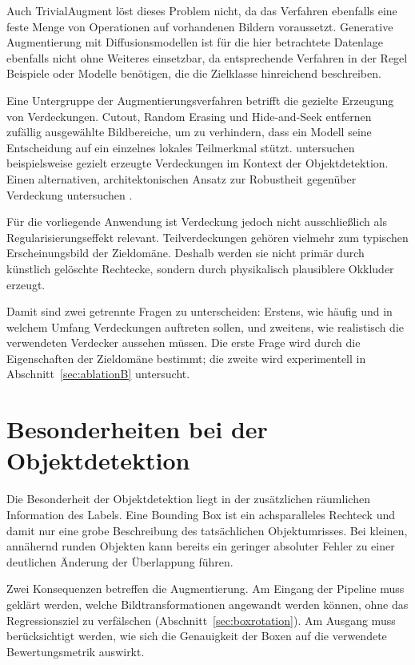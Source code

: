 Auch TrivialAugment \parencite{mueller2021} löst dieses Problem nicht, da das Verfahren ebenfalls eine feste Menge von Operationen auf vorhandenen Bildern voraussetzt. Generative Augmentierung mit Diffusionsmodellen \parencite{trabucco2024} ist für die hier betrachtete Datenlage ebenfalls nicht ohne Weiteres einsetzbar, da entsprechende Verfahren in der Regel Beispiele oder Modelle benötigen, die die Zielklasse hinreichend beschreiben.

Eine Untergruppe der Augmentierungsverfahren betrifft die gezielte Erzeugung von Verdeckungen. Cutout, Random Erasing und Hide-and-Seek entfernen zufällig ausgewählte Bildbereiche, um zu verhindern, dass ein Modell seine Entscheidung auf ein einzelnes lokales Teilmerkmal stützt. \textcite{wang2017afastrcnn} untersuchen beispielsweise gezielt erzeugte Verdeckungen im Kontext der Objektdetektion. Einen alternativen, architektonischen Ansatz zur Robustheit gegenüber Verdeckung untersuchen \textcite{kortylewski2020}.

Für die vorliegende Anwendung ist Verdeckung jedoch nicht ausschließlich als Regularisierungseffekt relevant. Teilverdeckungen gehören vielmehr zum typischen Erscheinungsbild der Zieldomäne. Deshalb werden sie nicht primär durch künstlich gelöschte Rechtecke, sondern durch physikalisch plausiblere Okkluder erzeugt.

Damit sind zwei getrennte Fragen zu unterscheiden: Erstens, wie häufig und in welchem Umfang Verdeckungen auftreten sollen, und zweitens, wie realistisch die verwendeten Verdecker aussehen müssen. Die erste Frage wird durch die Eigenschaften der Zieldomäne bestimmt; die zweite wird experimentell in Abschnitt~\ref{sec:ablationB} untersucht.

\section{Besonderheiten bei der Objektdetektion}
\label{sec:augdetektion}

Die Besonderheit der Objektdetektion liegt in der zusätzlichen räumlichen Information des Labels. Eine Bounding Box ist ein achsparalleles Rechteck und damit nur eine grobe Beschreibung des tatsächlichen Objektumrisses. Bei kleinen, annähernd runden Objekten kann bereits ein geringer absoluter Fehler zu einer deutlichen Änderung der Überlappung führen.

Zwei Konsequenzen betreffen die Augmentierung. Am Eingang der Pipeline muss geklärt werden, welche Bildtransformationen angewandt werden können, ohne das Regressionsziel zu verfälschen (Abschnitt~\ref{sec:boxrotation}). Am Ausgang muss berücksichtigt werden, wie sich die Genauigkeit der Boxen auf die verwendete Bewertungsmetrik auswirkt.

